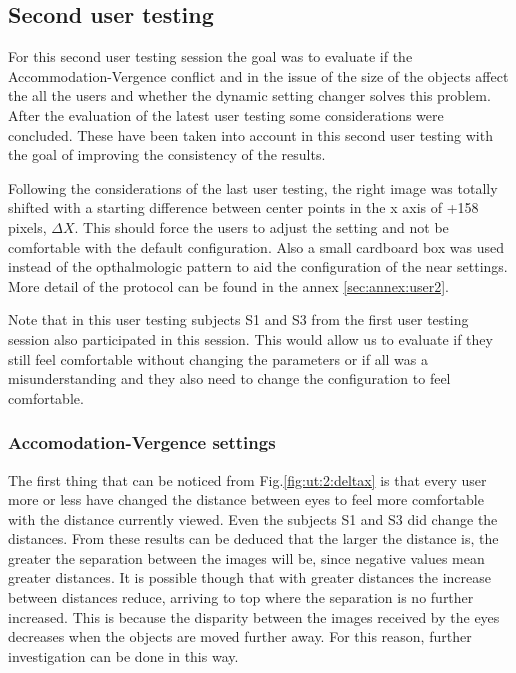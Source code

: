\documentclass[10pt,a4paper,twocolumn,twoside]{article}
\begin{document}
	
	\subsection{Second user testing}
	
	For this second user testing session the goal was to evaluate if the Accommodation-Vergence conflict and in the issue of the size of the objects affect the all the users and whether the dynamic setting changer solves this problem. After the evaluation of the latest user testing some considerations were concluded. These have been taken into account in this second user testing with the goal of improving the consistency of the results. 
	
	Following the considerations of the last user testing, the right image was totally shifted with a starting difference between center points in the x axis of +158 pixels, $\Delta X$. This should force the users to adjust the setting and not be comfortable with the default configuration. Also a small cardboard box was used instead of the opthalmologic pattern to aid the configuration of the near settings. More detail of the protocol can be found in the annex \ref{sec:annex:user2}.
	
	Note that in this user testing subjects S1 and S3 from the first user testing session also participated in this session. This would allow us to evaluate if they still feel comfortable without changing the parameters or if all was a misunderstanding and they also need to change the configuration to feel comfortable. 
	
	\subsubsection{Accomodation-Vergence settings}
	The first thing that can be noticed from Fig.\ref{fig:ut:2:deltax} is that every user more or less have changed the distance between eyes to feel more comfortable with the distance currently viewed. Even the subjects S1 and S3 did change the distances. From these results can be deduced that the larger the distance is, the greater the separation between the images will be, since negative values mean greater distances. It is possible though that with greater distances the increase between distances reduce, arriving to top where the separation is no further increased. This is because the disparity between the images received by the eyes decreases when the objects are moved further away. For this reason, further investigation can be done in this way. 
	
\end{document}
